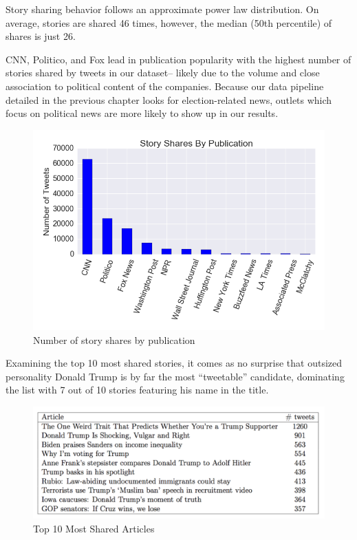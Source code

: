 \documentclass[letterpaper]{article}
\begin{document}
Story sharing behavior follows an approximate power law distribution. On average, stories are shared 46 times, however, the median (50th percentile) of shares is just 26. 


CNN, Politico, and Fox lead in publication popularity with the highest number of stories shared by tweets in our dataset-- likely due to the volume and close association to political content of the companies. Because our data pipeline detailed in the previous chapter looks for election-related news, outlets which focus on political news are more likely to show up in our results.


\begin{figure}[t!]  
\centering 
  \includegraphics[width=\columnwidth]{all-stories-by-pub}  
  \caption{Number of story shares by publication
    \label{fig:tweets-by-pub}}
\end{figure} 



Examining the top 10 most shared stories, it comes as no surprise that outsized personality Donald Trump is by far the most ``tweetable'' candidate, dominating the list with 7 out of 10 stories featuring his name in the title.

 
\begin{figure}[t!]  
\centering 
  \includegraphics[width=\columnwidth]{top-10-stories}  
  \caption{Top 10 Most Shared Articles
    \label{fig:top-10-stories}}
\end{figure} 
\end{document}

